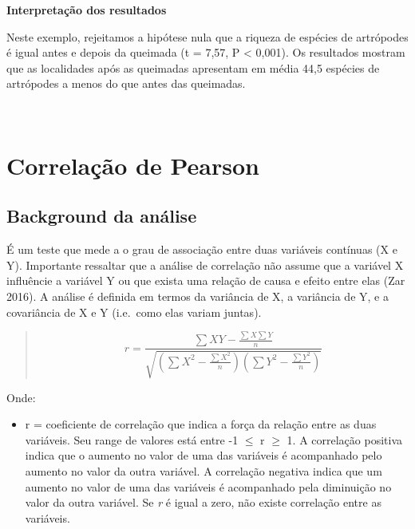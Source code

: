\documentclass[
]{book}
\providecommand{\tightlist}{%
  \setlength{\itemsep}{0pt}\setlength{\parskip}{0pt}}
\begin{document}
\textbf{Interpretação dos resultados}

Neste exemplo, rejeitamos a hipótese nula que a riqueza de espécies de artrópodes é igual antes e depois da queimada (t = 7,57, P \textless{} 0,001). Os resultados mostram que as localidades após as queimadas apresentam em média 44,5 espécies de artrópodes a menos do que antes das queimadas.

~

\hypertarget{correlauxe7uxe3o-de-pearson}{%
\section{Correlação de Pearson}\label{correlauxe7uxe3o-de-pearson}}

\hypertarget{background-da-anuxe1lise-2}{%
\subsection{Background da análise}\label{background-da-anuxe1lise-2}}

É um teste que mede a o grau de associação entre duas variáveis contínuas (X e Y). Importante ressaltar que a análise de correlação não assume que a variável X influêncie a variável Y ou que exista uma relação de causa e efeito entre elas (Zar 2016). A análise é definida em termos da variância de X, a variância de Y, e a covariância de X e Y (i.e.~como elas variam juntas).

\begin{quote}
\[ r = \frac{\sum{XY} - \frac{\sum{X} \sum{Y}}{n}}{\sqrt{\left(\sum{X^2} - \frac{\sum{X}^2}{n}\right)\left(\sum{Y^2} - \frac{\sum{Y}^2}{n}\right)}} \]
\end{quote}

Onde:

\begin{itemize}
\tightlist
\item
  r = coeficiente de correlação que indica a força da relação entre as duas variáveis. Seu range de valores está entre -1 \(\leq\) r \(\geq\) 1. A correlação positiva indica que o aumento no valor de uma das variáveis é acompanhado pelo aumento no valor da outra variável. A correlação negativa indica que um aumento no valor de uma das variáveis é acompanhado pela diminuição no valor da outra variável. Se \emph{r} é igual a zero, não existe correlação entre as variáveis.
\end{itemize}
\end{document}
